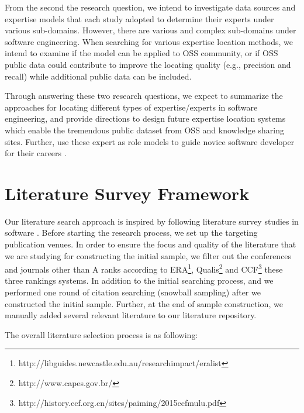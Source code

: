 \hfill\break
From the second the research question, we intend to investigate data sources and expertise models that each study adopted to determine their experts under various sub-domains. However, there are various and complex sub-domains under software engineering. When searching for various expertise location methods, we intend to examine if the model can be applied to OSS community, or if OSS public data could contribute to improve the locating quality (e.g., precision and recall) while additional public data can be included.

Through answering these two research questions, we expect to summarize the approaches for locating different types of expertise/experts in software engineering, and provide directions to design future expertise location systems which enable the tremendous public dataset from OSS and knowledge sharing sites. Further, use these expert as role models to guide novice software developer for their careers \cite{STEINMACHER201567}.

\section{Literature Survey Framework}

Our literature search approach is inspired by following literature survey studies in software \cite{STEINMACHER201567, Fathy2018Large}. Before starting the research process, we set up the targeting publication venues. In order to ensure the focus and quality of the literature that we are studying for constructing the initial sample, we filter out the conferences and journals other than A ranks according to ERA\footnote{http://libguides.newcastle.edu.au/researchimpact/eralist}, Qualis\footnote{http://www.capes.gov.br/} and CCF\footnote{http://history.ccf.org.cn/sites/paiming/2015ccfmulu.pdf} these three rankings systems. In addition to the initial searching process, and we performed one round of citation searching (snowball sampling) after we constructed the initial sample. Further, at the end of sample construction, we manually added several relevant literature to our literature repository.

The overall literature selection process is as following:

